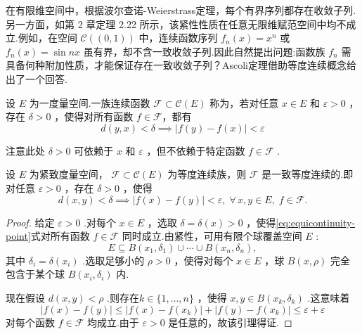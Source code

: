 在有限维空间中，根据波尔查诺-Weierstrass定理，每个有界序列都存在收敛子列.另一方面，如第 2 章定理 2.22 所示，该紧性性质在任意无限维赋范空间中均不成立.例如，在空间 $\mathcal{C}\left( \left(  {0,1}\right)  \right)$ 中，连续函数序列 ${f}_{n}\left( x\right)  = {x}^{n}$ 或 ${f}_{n}\left( x\right)  = \sin {nx}$ 虽有界，却不含一致收敛子列.因此自然提出问题:函数族 ${f}_{n}$ 需具备何种附加性质，才能保证存在一致收敛子列？Ascoli定理借助等度连续概念给出了一个回答.
\begin{definition}[等度连续]
    设 $E$ 为一度量空间.一族连续函数 $\mathcal{F} \subset  \mathcal{C}\left( E\right)$ 称为，若对任意 $x \in  E$ 和 $\varepsilon  > 0$ ，存在 $\delta  > 0$ ，使得对所有函数 $f \in  \mathcal{F}$，都有
\begin{equation}\tag{3.9}\label{eq:equicontinuity-point}
d\left( {y,x}\right)  < \delta \implies \left| {f\left( y\right)  - f\left( x\right) }\right|  < \varepsilon
\end{equation}
\end{definition}
注意此处 $\delta  > 0$ 可依赖于 $x$ 和 $\varepsilon$ ，但不依赖于特定函数 $f \in  \mathcal{F}$ .

\begin{lemma}\label{lem:equicontinuous-uniform}
设 $E$ 为紧致度量空间， $\mathcal{F} \subset  \mathcal{C}\left( E\right)$ 为等度连续族，则 $\mathcal{F}$ 是一致等度连续的.即对任意 $\varepsilon  > 0$ ，存在 $\delta  > 0$ ，使得
\begin{equation}\tag{3.10}\label{eq:equicontinuity-uniform}
d\left( {x,y}\right)  < \delta \implies \left| {f\left( x\right)  - f\left( y\right) }\right|  < \varepsilon ,\;\forall\,x,y \in  E,\;f \in  \mathcal{F}.
\end{equation}
\end{lemma}

\begin{proof}
给定 $\varepsilon  > 0$ .对每个 $x \in  E$ ，选取 $\delta  = \delta \left( x\right)  > 0$ ，使得\eqref{eq:equicontinuity-point}式对所有函数 $f \in  \mathcal{F}$ 同时成立.由紧性，可用有限个球覆盖空间 $E$ :
\[
E \subseteq  B\left( {{x}_{1},{\delta }_{1}}\right)  \cup  \cdots  \cup  B\left( {{x}_{n},{\delta }_{n}}\right) ,
\]
其中 ${\delta }_{i} = \delta \left( {x}_{i}\right)$ .选取足够小的 $\rho  > 0$ ，使得对每个 $x \in  E$ ，球 $B\left( {x,\rho }\right)$ 完全包含于某个球 $B\left( {{x}_{i},{\delta }_{i}}\right)$ 内.

现在假设 $d\left( {x,y}\right)  < \rho$ .则存在$k \in  \{ 1,\ldots ,n\}$ ，使得 $x,y \in  B\left( {{x}_{k},{\delta }_{k}}\right)$ .这意味着
\[
\left| {f\left( x\right)  - f\left( y\right) }\right|  \leq  \left| {f\left( x\right)  - f\left( {x}_{k}\right) }\right|  + \left| {f\left( y\right)  - f\left( {x}_{k}\right) }\right|  \leq  \varepsilon  + \varepsilon
\]
对每个函数 $f \in  \mathcal{F}$ 均成立.由于 $\varepsilon  > 0$ 是任意的，故该引理得证.
\end{proof}

